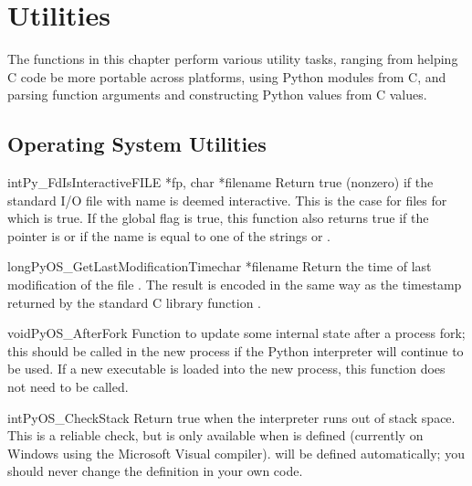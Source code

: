 \chapter{Utilities \label{utilities}}

The functions in this chapter perform various utility tasks, ranging
from helping C code be more portable across platforms, using Python
modules from C, and parsing function arguments and constructing Python
values from C values.


\section{Operating System Utilities \label{os}}

\begin{cfuncdesc}{int}{Py_FdIsInteractive}{FILE *fp, char *filename}
  Return true (nonzero) if the standard I/O file  with name
   is deemed interactive.  This is the case for files
  for which  is true.  If the global
  flag  is true, this function also returns
  true if the  pointer is \NULL{} or if the name is
  equal to one of the strings  or .
\end{cfuncdesc}

\begin{cfuncdesc}{long}{PyOS_GetLastModificationTime}{char *filename}
  Return the time of last modification of the file .
  The result is encoded in the same way as the timestamp returned by
  the standard C library function .
\end{cfuncdesc}

\begin{cfuncdesc}{void}{PyOS_AfterFork}{}
  Function to update some internal state after a process fork; this
  should be called in the new process if the Python interpreter will
  continue to be used.  If a new executable is loaded into the new
  process, this function does not need to be called.
\end{cfuncdesc}

\begin{cfuncdesc}{int}{PyOS_CheckStack}{}
  Return true when the interpreter runs out of stack space.  This is a
  reliable check, but is only available when 
  is defined (currently on Windows using the Microsoft Visual \Cpp{}
  compiler).   will be
  defined automatically; you should never change the definition in
  your own code.
\end{cfuncdesc}

